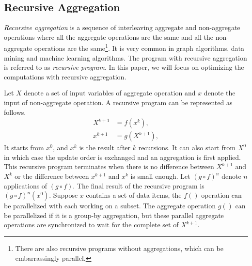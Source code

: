 

\subsection{Recursive Aggregation}

\emph{Recursive aggregation} is a sequence of interleaving aggregate and non-aggregate operations where all the aggregate operations are the same and all the non-aggregate operations are the same\footnote{There are also recursive programs without aggregations, which can be embarrassingly parallel.}. It is very common in graph algorithms, data mining and machine learning algorithms. The program with recursive aggregation is referred to as \emph{recursive program}. In this paper, we will focus on optimizing the computations with recursive aggregation.


Let $X$ denote a set of input variables of aggregate operation and $x$ denote the input of non-aggregate operation. A recursive program can be represented as follows.
\begin{equation}
\label{eq:recursive2}
\begin{aligned}
X^{k+1}&=f(x^k),\\
x^{k+1}&=g(X^{k+1}),
\end{aligned}
\end{equation}
It starts from $x^0$, and $x^k$ is the result after $k$ recursions. It can also start from $X^0$ in which case the update order is exchanged and an aggregation is first applied. This recursive program terminates when there is no difference between $X^{k+1}$ and $X^k$ or the difference between $x^{k+1}$ and $x^k$ is small enough. Let $(g\circ f)^n$ denote $n$ applications of $(g\circ f)$. The final result of the recursive program is $(g\circ f)^n(x^0)$. Suppose $x$ contains a set of data items, the $f()$ operation can be parallelized with each working on a subset. The aggregate operation $g()$ can be parallelized if it is a group-by aggregation, but these parallel aggregate operations are synchronized to wait for the complete set of $X^{k+1}$.

